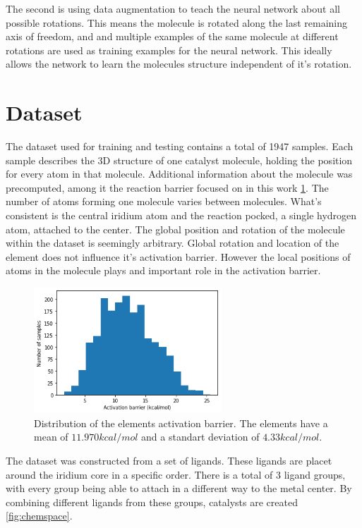 The second is using data augmentation to teach the neural network about all possible rotations.
This means the molecule is rotated along the last remaining axis of freedom, and and multiple examples of the same molecule at different rotations are used as training examples for the neural network.
This ideally allows the network to learn the molecules structure independent of it's rotation.


\section{Dataset}

The dataset used for training and testing contains a total of 1947 samples.
Each sample describes the 3D structure of one catalyst molecule, 
holding the position for every atom in that molecule.
Additional information about the molecule was precomputed, among it the reaction barrier focused on in this work \ref{fig:barriers}.
The number of atoms forming one molecule varies between molecules.
What's consistent is the central iridium atom and the reaction pocked, a single hydrogen atom, attached to the center.
The global position and rotation of the molecule within the dataset is seemingly arbitrary.
Global rotation and location of the element does not influence it's activation barrier.
However the local positions of atoms in the molecule plays and important role in the activation barrier.

\begin{figure}
  \centering
  \includegraphics[width=7cm]{figures/introduction/barrier.png}
  \caption{Distribution of the elements activation barrier. The elements have a mean of $11.970 kcal/mol$ and a standart deviation of $4.33 kcal/mol$.}
  \label{fig:barriers}
\end{figure}

The dataset was constructed from a set of ligands.
These ligands are placet around the iridium core in a specific order.
There is a total of 3 ligand groups, with every group being able to attach in a different way to the metal center.
By combining different ligands from these groups, catalysts are created \ref{fig:chemspace}.

